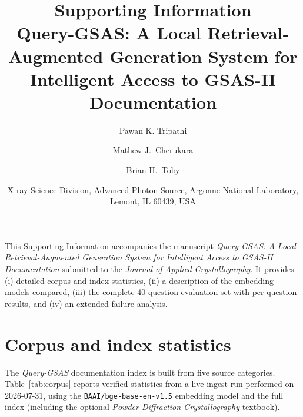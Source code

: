 \documentclass[12pt,a4paper]{article}
\title{\textbf{Supporting Information}\\[6pt]
\large Query-GSAS: A Local Retrieval-Augmented Generation System
for Intelligent Access to GSAS-II Documentation}
\author{
  Pawan K. Tripathi \and
  Mathew J.\ Cherukara \and
  Brian H.\ Toby
}
\date{
  X-ray Science Division, Advanced Photon Source,
  Argonne National Laboratory, Lemont, IL 60439, USA
}
\begin{document}
\maketitle

\noindent This Supporting Information accompanies the manuscript
\textit{Query-GSAS: A Local Retrieval-Augmented Generation System for
Intelligent Access to GSAS-II Documentation} submitted to the
\textit{Journal of Applied Crystallography}.
It provides (i) detailed corpus and index statistics, (ii) a description
of the embedding models compared, (iii) the complete 40-question evaluation
set with per-question results, and (iv) an extended failure analysis.

\tableofcontents
\clearpage

\section{Corpus and index statistics}
\label{sec:corpus}

The \textit{Query-GSAS} documentation index is built from five source
categories.
Table~\ref{tab:corpus} reports verified statistics from a live ingest
run performed on 2026-07-31, using the
\texttt{BAAI/bge-base-en-v1.5} embedding model and the full index
(including the optional \textit{Powder Diffraction Crystallography}
textbook).
\end{document}
